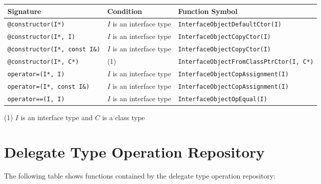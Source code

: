 \documentclass[a4paper,oneside,11pt]{book}
\theoremstyle{definition}
\begin{document}
\begin{flushleft}
\begin{supertabular}{lll}
\textbf{Signature}& \textbf{Condition}& \textbf{Function Symbol}\\
\hline
\verb|@constructor(I*)|& $I$ is an interface type& \verb|InterfaceObjectDefaultCtor(I)|\\
\verb|@constructor(I*, I)|& $I$ is an interface type& \verb|InterfaceObjectCopyCtor(I)|\\
\verb|@constructor(I*, const I&)|& $I$ is an interface type& \verb|InterfaceObjectCopyCtor(I)|\\
\verb|@constructor(I*, C*)|& (1)& \verb|InterfaceObjectFromClassPtrCtor(I, C*)|\\
\verb|operator=(I*, I)|& $I$ is an interface type& \verb|InterfaceObjectCopAssignment(I)|\\
\verb|operator=(I*, const I&)|& $I$ is an interface type& \verb|InterfaceObjectCopAssignment(I)|\\
\verb|operator==(I, I)|& $I$ is an interface type& \verb|InterfaceObjectOpEqual(I)|\\
\hline
\end{supertabular}
\end{flushleft}

\begin{flushleft}
(1) $I$ is an interface type and $C$ is a class type
\end{flushleft}

\section{Delegate Type Operation Repository}

The following table shows functions contained by the delegate type operation repository:
\end{document}
